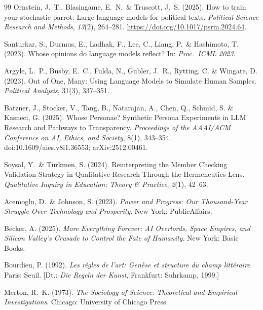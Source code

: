 \documentclass[12pt,a4paper]{article}
\begin{document}
\begin{thebibliography}{99}
  Ornstein, J.~T., Blasingame, E.~N.~\& Truscott, J.~S. (2025).
  How to train your stochastic parrot: Large language models for political texts.
  \textit{Political Science Research and Methods}, \textit{13}(2), 264--281.
  \url{https://doi.org/10.1017/psrm.2024.64}.

  Santurkar, S., Durmus, E., Ladhak, F., Lee, C., Liang, P.~\& Hashimoto, T. (2023).
  Whose opinions do language models reflect?
  In: \textit{Proc.\ ICML 2023}.

  Argyle, L.~P., Busby, E.~C., Fulda, N., Gubler, J.~R., Rytting, C. \& Wingate, D. (2023).
  Out of One, Many: Using Language Models to Simulate Human Samples.
  \textit{Political Analysis}, 31(3), 337--351.

  Batzner, J., Stocker, V., Tang, B., Natarajan, A., Chen, Q., Schmid, S. \& Kasneci, G. (2025).
  Whose Personae? Synthetic Persona Experiments in LLM Research and Pathways to Transparency.
  \textit{Proceedings of the AAAI/ACM Conference on AI, Ethics, and Society}, 8(1), 343--354.
  doi:10.1609/aies.v8i1.36553; arXiv:2512.00461.

  Soysal, Y.~\& T\"urkmen, S. (2024).
  Reinterpreting the Member Checking Validation Strategy in Qualitative Research Through the Hermeneutics Lens.
  \textit{Qualitative Inquiry in Education: Theory \& Practice}, \textit{2}(1), 42--63.

  Acemoglu, D.~\& Johnson, S. (2023).
  \textit{Power and Progress: Our Thousand-Year Struggle Over Technology and Prosperity}.
  New York: PublicAffairs.

  Becker, A. (2025).
  \textit{More Everything Forever: AI Overlords, Space Empires, and Silicon Valley's Crusade to Control the Fate of Humanity}.
  New York: Basic Books.

  Bourdieu, P. (1992).
  \textit{Les r\`egles de l'art: Gen\`ese et structure du champ litt\'eraire}.
  Paris: Seuil.
  [Dt.: \textit{Die Regeln der Kunst}, Frankfurt: Suhrkamp, 1999.]

  Merton, R.~K. (1973).
  \textit{The Sociology of Science: Theoretical and Empirical Investigations}.
  Chicago: University of Chicago Press.


\end{thebibliography}
\end{document}
